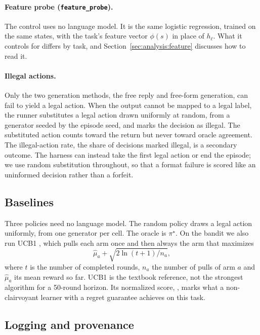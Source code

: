 \paragraph{Feature probe (\texttt{feature\_probe}).}
The control uses no language model. It is the same logistic regression, trained on the same states, with the task's feature vector $\phi(s)$ in place of $h_\ell$. What it controls for differs by task, and Section~\ref{sec:analysis:feature} discusses how to read it.

\paragraph{Illegal actions.}
Only the two generation methods, the free reply and free-form generation, can fail to yield a legal action. When the output cannot be mapped to a legal label, the runner substitutes a legal action drawn uniformly at random, from a generator seeded by the episode seed, and marks the decision as illegal. The substituted action counts toward the return but never toward oracle agreement. The illegal-action rate, the share of decisions marked illegal, is a secondary outcome. The harness can instead take the first legal action or end the episode; we use random substitution throughout, so that a format failure is scored like an uninformed decision rather than a forfeit.

\subsection{Baselines}
\label{sec:bench:baselines}

Three policies need no language model. The random policy draws a legal action uniformly, from one generator per cell. The oracle is $\pi^\star$. On the bandit we also run UCB1 \citep{auer2002ucb}, which pulls each arm once and then always the arm that maximizes
\begin{equation}
\hat\mu_a + \sqrt{2\ln(t+1)/n_a},
\end{equation}
where $t$ is the number of completed rounds, $n_a$ the number of pulls of arm $a$ and $\hat\mu_a$ its mean reward so far. UCB1 is the textbook reference, not the strongest algorithm for a 50-round horizon. Its normalized score, , marks what a non-clairvoyant learner with a regret guarantee achieves on this task.

\subsection{Logging and provenance}
\label{sec:bench:logs}

